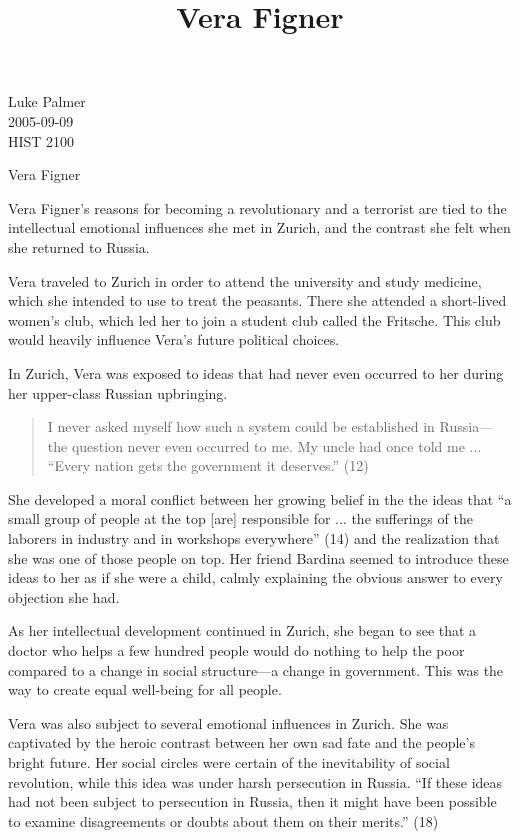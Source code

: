 \documentclass[12pt]{article}
\title{Vera Figner}
\begin{document}
\noindent Luke Palmer \\
2005-09-09 \\
HIST 2100

\begin{center}
\Huge{Vera Figner}
\end{center}

\doublespace

Vera Figner's reasons for becoming a revolutionary and a terrorist are
tied to the intellectual emotional influences she met in Zurich, and the
contrast she felt when she returned to Russia.

Vera traveled to Zurich in order to attend the university and study
medicine, which she intended to use to treat the peasants.  There she
attended a short-lived women's club, which led her to join a student
club called the Fritsche.  This club would heavily influence Vera's
future political choices.

In Zurich, Vera was exposed to ideas that had never even occurred to her
during her upper-class Russian upbringing.  

\begin{quote}
\singlespace
I never asked myself how such a system could be established in
Russia---the question never even occurred to me.  My uncle had once told
me ... ``Every nation gets the government it deserves.'' (12)
\end{quote} 

She developed a moral conflict between her growing belief in the the
ideas that ``a small group of people at the top [are] responsible for
... the sufferings of the laborers in industry and in workshops
everywhere'' (14) and the realization that she was one of those people
on top.  Her friend Bardina seemed to introduce these ideas to her as if
she were a child, calmly explaining the obvious answer to every
objection she had.

As her intellectual development continued in Zurich, she began to see
that a doctor who helps a few hundred people would do nothing to help
the poor compared to a change in social structure---a change in
government.  This was the way to create equal well-being for all people.

Vera was also subject to several emotional influences in Zurich.  She
was captivated by the heroic contrast between her own sad fate and the
people's bright future.  Her social circles were certain of the
inevitability of social revolution, while this idea was under harsh
persecution in Russia.  ``If these ideas had not been subject to
persecution in Russia, then it might have been possible to examine
disagreements or doubts about them on their merits.'' (18)
\end{document}
